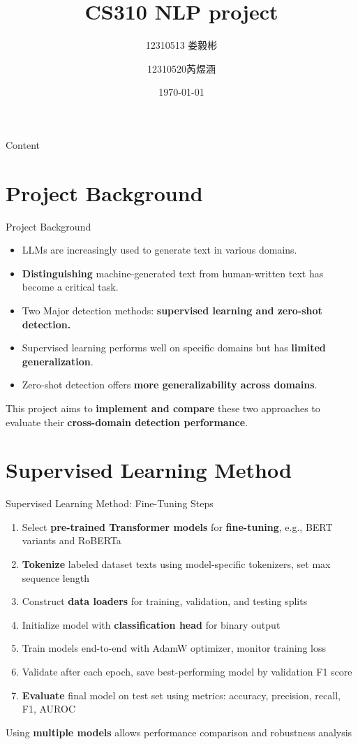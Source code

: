 \documentclass[serif]{beamer}
\title{CS310 NLP project}
\author{12310513 娄毅彬 \and 12310520芮煜涵}
\institute{Southern University of Science and Technology \and Department of Computer Science and Engineering}
\date{\today}
\begin{document}
\begin{frame}
  \titlepage
\end{frame}

\begin{frame}{Content}
  \tableofcontents
\end{frame}


\section{Project Background}
\begin{frame}{Project Background}
\begin{itemize}
  \item LLMs are increasingly used to generate text in various domains.
  \item \textbf{Distinguishing} machine-generated text from human-written text has become a critical task.
  \item Two Major detection methods: \textbf{supervised learning and zero-shot detection.}
  \item Supervised learning performs well on specific domains but has \textbf{limited generalization}.
  \item Zero-shot detection offers \textbf{more generalizability across domains}.
\end{itemize}

This project aims to \textbf{implement and compare} these two approaches to evaluate their \textbf{cross-domain detection performance}.
\end{frame}
\section{Supervised Learning Method}

\begin{frame}{Supervised Learning Method: Fine-Tuning Steps}
\begin{enumerate}
  \item Select \textbf{pre-trained Transformer models} for \textbf{fine-tuning}, e.g., BERT variants and RoBERTa
  \item \textbf{Tokenize} labeled dataset texts using model-specific tokenizers, set max sequence length
  \item Construct \textbf{data loaders} for training, validation, and testing splits
  \item Initialize model with \textbf{classification head} for binary output
  \item Train models end-to-end with AdamW optimizer, monitor training loss
  \item Validate after each epoch, save best-performing model by validation F1 score
  \item \textbf{Evaluate} final model on test set using metrics: accuracy, precision, recall, F1, AUROC
\end{enumerate}
\vspace{0.3cm}
\small{Using \textbf{multiple models} allows performance comparison and robustness analysis}
\end{frame}
\end{document}
